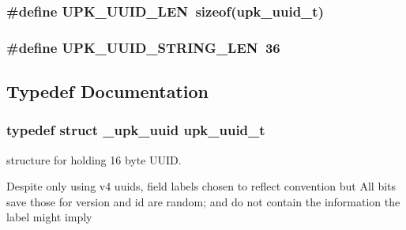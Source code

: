 \subsubsection{\setlength{\rightskip}{0pt plus 5cm}\#define UPK\_\-UUID\_\-LEN~sizeof(\bf{upk\_\-uuid\_\-t})}\label{group__uuid_gb294a1d1f48183f965fe86ba9bc47e72}


\subsubsection{\setlength{\rightskip}{0pt plus 5cm}\#define UPK\_\-UUID\_\-STRING\_\-LEN~36}\label{group__uuid_g6e7328b66e79311c054e1fd3ace2d85a}




\subsection{Typedef Documentation}
\subsubsection{\setlength{\rightskip}{0pt plus 5cm}typedef struct \bf{\_\-upk\_\-uuid}  \bf{upk\_\-uuid\_\-t}}\label{group__uuid_g74d0f936b166222edae92eec2c72e67f}


structure for holding 16 byte UUID. 

Despite only using v4 uuids, field labels chosen to reflect convention but All bits save those for version and id are random; and do not contain the information the label might imply 